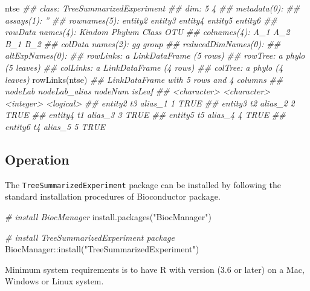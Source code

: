 \documentclass[]{article}
\newcommand{\hlstr}[1]{\textcolor[rgb]{0.251,0.627,0.251}{#1}}%
\newcommand{\hlcom}[1]{\textcolor[rgb]{0.502,0.502,0.502}{\textit{#1}}}%
\newcommand{\hlopt}[1]{\textcolor[rgb]{0,0,0}{#1}}%
\newcommand{\hlstd}[1]{\textcolor[rgb]{0.251,0.251,0.251}{#1}}%
\newcommand{\hlkwd}[1]{\textcolor[rgb]{0.878,0.439,0.125}{#1}}%
\newenvironment{Shaded}{\begin{myshaded}}{\end{myshaded}}
\newcommand{\KeywordTok}[1]{\hlkwd{#1}}
\newcommand{\StringTok}[1]{\hlstr{#1}}
\newcommand{\CommentTok}[1]{\hlcom{#1}}
\newcommand{\OperatorTok}[1]{\hlopt{#1}}
\newcommand{\NormalTok}[1]{\hlstd{#1}}
\begin{document}
\begin{Shaded}
\begin{Highlighting}[]
\NormalTok{ntse}
\CommentTok{## class: TreeSummarizedExperiment }
\CommentTok{## dim: 5 4 }
\CommentTok{## metadata(0):}
\CommentTok{## assays(1): ''}
\CommentTok{## rownames(5): entity2 entity3 entity4 entity5 entity6}
\CommentTok{## rowData names(4): Kindom Phylum Class OTU}
\CommentTok{## colnames(4): A_1 A_2 B_1 B_2}
\CommentTok{## colData names(2): gg group}
\CommentTok{## reducedDimNames(0):}
\CommentTok{## altExpNames(0):}
\CommentTok{## rowLinks: a LinkDataFrame (5 rows)}
\CommentTok{## rowTree: a phylo (5 leaves)}
\CommentTok{## colLinks: a LinkDataFrame (4 rows)}
\CommentTok{## colTree: a phylo (4 leaves)}
\KeywordTok{rowLinks}\NormalTok{(ntse)}
\CommentTok{## LinkDataFrame with 5 rows and 4 columns}
\CommentTok{##             nodeLab nodeLab_alias   nodeNum    isLeaf}
\CommentTok{##         <character>   <character> <integer> <logical>}
\CommentTok{## entity2          t3       alias_1         1      TRUE}
\CommentTok{## entity3          t2       alias_2         2      TRUE}
\CommentTok{## entity4          t1       alias_3         3      TRUE}
\CommentTok{## entity5          t5       alias_4         4      TRUE}
\CommentTok{## entity6          t4       alias_5         5      TRUE}
\end{Highlighting}
\end{Shaded}

\hypertarget{operation}{%
\subsection{Operation}\label{operation}}

The \texttt{TreeSummarizedExperiment} package can be installed by following the standard installation procedures of Bioconductor package.

\begin{Shaded}
\begin{Highlighting}[]
\CommentTok{# install BiocManager}
\KeywordTok{install.packages}\NormalTok{(}\StringTok{"BiocManager"}\NormalTok{)}

\CommentTok{# install TreeSummarizedExperiment package}
\NormalTok{BiocManager}\OperatorTok{::}\KeywordTok{install}\NormalTok{(}\StringTok{"TreeSummarizedExperiment"}\NormalTok{)}
\end{Highlighting}
\end{Shaded}

Minimum system requirements is to have R with version (3.6 or later) on a Mac, Windows or Linux system.
\end{document}
